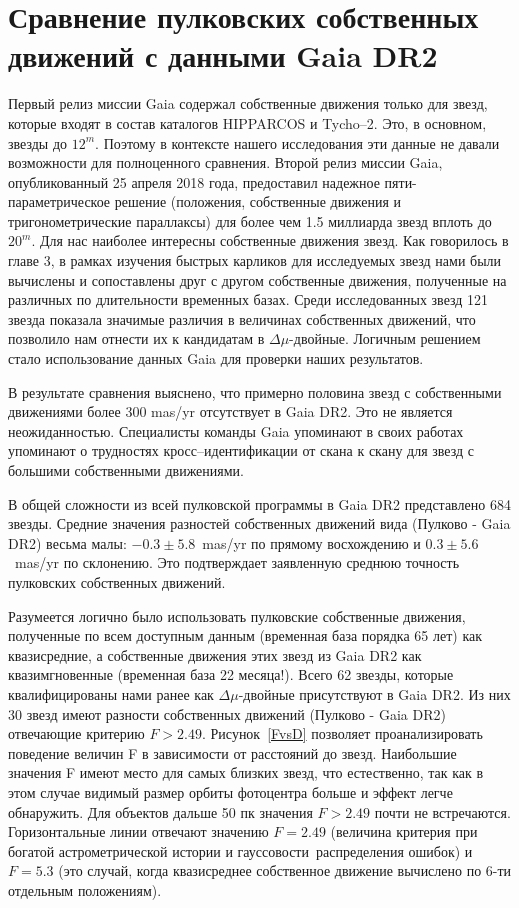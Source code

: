\chapter{Сравнение пулковских собственных движений с данными Gaia DR2} \label{ch:ch6}
Первый релиз миссии Gaia содержал собственные движения только для звезд, которые входят в состав каталогов HIPPARCOS и Tycho--2. Это, в основном, звезды до $12^m$. Поэтому в контексте нашего исследования эти данные не давали возможности для полноценного сравнения. Второй релиз миссии Gaia, опубликованный 25 апреля 2018 года, предоставил надежное пяти-параметрическое решение (положения, собственные движения и тригонометрические параллаксы) для более чем 1.5 миллиарда звезд  вплоть до $20^m$. Для нас наиболее интересны собственные движения звезд. Как говорилось в главе 3, в рамках изучения быстрых карликов для исследуемых звезд нами  были вычислены и сопоставлены друг с другом собственные движения, полученные на различных по длительности временных базах. Среди исследованных звезд 121 звезда показала значимые различия в величинах собственных движений, что позволило нам отнести их к кандидатам в $\Delta\mu$-двойные. Логичным решением стало использование данных Gaia для проверки наших результатов.

В результате сравнения выяснено, что примерно половина звезд с собственными движениями более 300 mas/yr отсутствует в Gaia DR2. Это не является неожиданностью. Специалисты команды Gaia упоминают в своих работах  упоминают о трудностях кросс--идентификации от скана к скану для звезд с большими собственными движениями.

В общей сложности из всей пулковской программы в Gaia DR2 представлено 684 звезды. Средние значения разностей собственных движений вида (Пулково - Gaia DR2) весьма малы: $-0.3\pm5.8$~mas/yr по прямому восхождению и $0.3\pm5.6$~mas/yr по склонению. Это подтверждает заявленную среднюю точность пулковских собственных движений.

Разумеется логично было использовать пулковские собственные движения, полученные по всем доступным данным (временная база порядка 65 лет) как квазисредние, а собственные движения этих звезд из Gaia DR2 как квазимгновенные (временная база 22 месяца!). Всего 62 звезды, которые квалифицированы нами ранее как $\Delta\mu$-двойные присутствуют в Gaia DR2. Из них 30 звезд имеют разности собственных движений  (Пулково - Gaia DR2) отвечающие критерию $F>2.49$. Рисунок~\ref{FvsD} позволяет проанализировать поведение величин F в зависимости от расстояний до звезд. Наибольшие значения F имеют место для самых близких звезд, что естественно, так как в этом случае видимый размер орбиты фотоцентра больше и эффект легче обнаружить. Для объектов дальше 50 пк значения $F>2.49$ почти не встречаются. Горизонтальные линии отвечают значению $F=2.49$ (величина критерия при богатой астрометрической истории и \glqq гауссовости\grqq\ распределения ошибок) и $F=5.3$ (это случай, когда квазисреднее собственное движение вычислено по 6-ти отдельным положениям).

